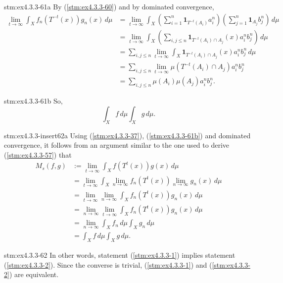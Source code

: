 \begin{statement}{stm:ex4.3.3-61a}
By (\ref{stm:ex4.3.3-60}) and by dominated convergence,
\begin{align*}
\lim_{t \to \infty} \int_X f_n(T^{-t}(x)) g_n(x) \, d\mu 
&= \lim_{t \to \infty} \int_X \left( \sum_{i=1}^n \mathbf{1}_{T^{-t}(A_i)} a_i^n \right) \left( \sum_{j=1}^n \mathbf{1}_{A_j} b_j^n \right) \, d\mu \\
&= \lim_{t \to \infty} \int_X \left( \sum_{i,j \leq n} \mathbf{1}_{T^{-t}(A_i) \cap A_j}(x) a_i^n b_j^n \right) \, d\mu \\
&= \sum_{i,j \leq n} \lim_{t \to \infty} \int_X \mathbf{1}_{T^{-t}(A_i) \cap A_j}(x) a_i^n b_j^n \, d\mu \\
&= \sum_{i,j \leq n} \lim_{t \to \infty} \mu(T^{-t}(A_i) \cap A_j) a_i^n b_j^n \\
&= \sum_{i,j \leq n} \mu(A_i) \mu(A_j) a_i^n b_j^n.
\end{align*}
\end{statement}

\begin{statement}{stm:ex4.3.3-61b}
So,
\[
\int_X f \, d\mu \int_X g \, d\mu.
\]
\end{statement}

\begin{statement}{stm:ex4.3.3-insert62a}
Using (\ref{stm:ex4.3.3-37}), (\ref{stm:ex4.3.3-61b}) and dominated convergence, it follows from an argument similar to the one used to derive (\ref{stm:ex4.3.3-57}) that
\begin{align*}
M_s(f, g) 
&:= \lim_{t \to \infty} \int_X f(T^t(x)) g(x) \, d\mu \\
&= \lim_{t \to \infty} \int_X \lim_{n \to \infty} f_n(T^t(x)) \lim_{n \to \infty} g_n(x) \, d\mu \\
&= \lim_{t \to \infty} \lim_{n \to \infty} \int_X f_n(T^t(x)) g_n(x) \, d\mu \\
&= \lim_{n \to \infty} \lim_{t \to \infty} \int_X f_n(T^t(x)) g_n(x) \, d\mu \\
&= \lim_{n \to \infty} \int_X f_n \, d\mu \int_X g_n \, d\mu \\
&= \int_X f \, d\mu \int_X g \, d\mu.
\end{align*}
\end{statement}

\begin{statement}{stm:ex4.3.3-62}
In other words, statement (\ref{stm:ex4.3.3-1}) implies statement (\ref{stm:ex4.3.3-2}). Since the converse is trivial, (\ref{stm:ex4.3.3-1}) and (\ref{stm:ex4.3.3-2}) are equivalent.
\end{statement}